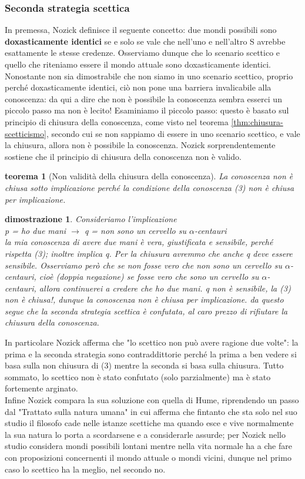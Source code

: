 \documentclass[10pt,a4paper]{article}
\newtheorem{teorema}{teorema}
\newtheorem{dimostrazione}{dimostrazione}
\begin{document}
\subsubsection*{Seconda strategia scettica}
In premessa, Nozick definisce il seguente concetto: due mondi possibili sono \textbf{doxasticamente identici} se e solo se vale che nell'uno e nell'altro S avrebbe esattamente le stesse credenze. Osserviamo dunque che lo scenario scettico e quello che riteniamo essere il mondo attuale sono doxasticamente identici.\\
Nonostante non sia dimostrabile che non siamo in uno scenario scettico, proprio perché doxasticamente identici, ciò non pone una barriera invalicabile alla conoscenza: da qui a dire che non è possibile la conoscenza sembra esserci un piccolo passo ma non è lecito! Esaminiamo il piccolo passo: questo è basato sul principio di chiusura della conoscenza, come visto nel teorema \ref{thm:chiusura-scetticismo}, secondo cui se non sappiamo di essere in uno scenario scettico, e vale la chiusura, allora non è possibile la conoscenza. Nozick sorprendentemente sostiene che il principio di chiusura della conoscenza non è valido. 
\begin{teorema}[Non validità della chiusura della conoscenza]
	La conoscenza non è chiusa sotto implicazione perché la condizione della conoscenza (3) non è chiusa per implicazione.
\end{teorema}
\begin{dimostrazione}
	Consideriamo l'implicazione\\
	p = ho due mani $\rightarrow$ q = non sono un cervello su $\alpha$-centauri\\
	la mia conoscenza di avere due mani è vera, giustificata e sensibile, perché rispetta (3); inoltre implica q. Per la chiusura avremmo che anche q deve essere sensibile. Osserviamo però che se non fosse vero che non sono un cervello su $\alpha$-centauri, cioè (doppia negazione) se fosse vero che sono un cervello su \(\alpha\)-centauri, allora continuerei a credere che ho due mani. q non è sensibile, la (3) non è chiusa!, dunque la conoscenza non è chiusa per implicazione. da questo segue che la seconda strategia scettica è confutata, al caro prezzo di rifiutare la chiusura della conoscenza.
\end{dimostrazione}
In particolare Nozick afferma che "lo scettico non può avere ragione due volte": la prima e la seconda strategia sono contraddittorie perché la prima a ben vedere si basa sulla non chiusura di (3) mentre la seconda si basa sulla chiusura. Tutto sommato, lo scettico non è stato confutato (solo parzialmente) ma è stato fortemente arginato.\\
Infine Nozick compara la sua soluzione con quella di Hume, riprendendo un passo dal "Trattato sulla natura umana" in cui afferma che fintanto che sta solo nel suo studio il filosofo cade nelle istanze scettiche ma quando esce e vive normalmente la sua natura lo porta a scordarsene e a considerarle assurde; per Nozick nello studio considera mondi possibili lontani mentre nella vita normale ha a che fare con proposizioni concernenti il mondo attuale o mondi vicini, dunque nel primo caso lo scettico ha la meglio, nel secondo no.
\newpage
\end{document}
